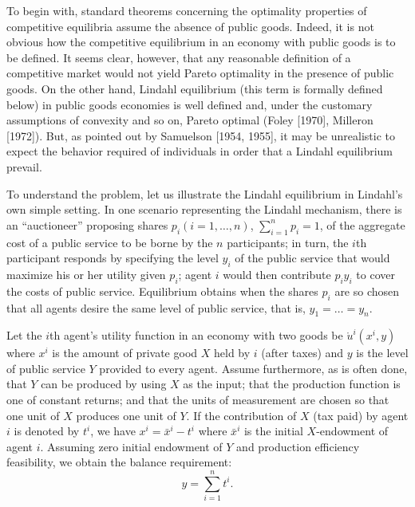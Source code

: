 \documentclass[12pt, letterpaper]{article}
\begin{document}
To begin with, standard theorems concerning the optimality properties of competitive equilibria assume the absence of public goods. Indeed, it is not obvious how the competitive equilibrium in an economy with public goods is to be defined. It seems clear, however, that any reasonable definition of a competitive market would not yield Pareto optimality in the presence of public goods. On the other hand, Lindahl equilibrium (this term is formally defined below) in public goods economies is well defined and, under the customary assumptions of convexity and so on, Pareto optimal (Foley [1970], Milleron [1972]). But, as pointed out by Samuelson [1954, 1955], it may be unrealistic to expect the behavior required of individuals in order that a Lindahl equilibrium prevail.

To understand the problem, let us illustrate the Lindahl equilibrium in Lindahl's own simple setting. In one scenario representing the Lindahl mechanism, there is an ``auctioneer'' proposing shares $p_i (i = 1, \dots, n)$, $\sum_{i=1}^n p_i = 1$, of the aggregate cost of a public service to be borne by the $n$ participants; in turn, the $i$th participant responds by specifying the level $y_i$ of the public service that would maximize his or her utility given $p_i$; agent $i$ would then contribute $p_i y_i$ to cover the costs of public service. Equilibrium obtains when the shares $p_i$ are so chosen that all agents desire the same level of public service, that is, $y_1 = \dots = y_n$.

Let the $i$th agent's utility function in an economy with two goods be $\mathring{u}^i(x^i, y)$ where $x^i$ is the amount of private good $X$ held by $i$ (after taxes) and $y$ is the level of public service $Y$ provided to every agent. Assume furthermore, as is often done, that $Y$ can be produced by using $X$ as the input; that the production function is one of constant returns; and that the units of measurement are chosen so that one unit of $X$ produces one unit of $Y$. If the contribution of $X$ (tax paid) by agent $i$ is denoted by $t^i$, we have $x^i = \bar{x}^i - t^i$ where $\bar{x}^i$ is the initial $X$-endowment of agent $i$. Assuming zero initial endowment of $Y$ and production efficiency feasibility, we obtain the balance requirement:
\[
y = \sum_{i=1}^{n} t^i.
\]
\end{document}
